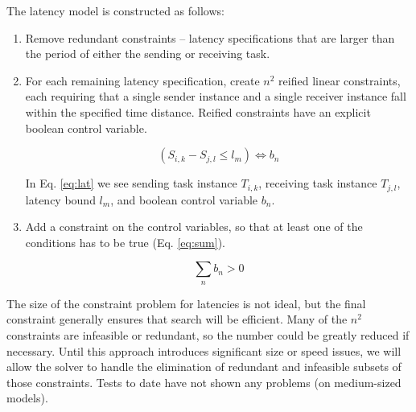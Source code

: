 The latency model is constructed as follows:

\begin{enumerate}
\item Remove redundant constraints -- latency specifications that are larger than the period of either the sending or receiving task.
\item For each remaining latency specification, create $n^2$ reified linear constraints, each requiring that a single sender instance and a single receiver instance fall within the specified time distance.  Reified constraints have an explicit boolean control variable.

\begin{equation}
\label{eq:lat}
(S_{i,k}  - S_{j,l}  \leqslant l_m ) \Leftrightarrow b_n 
\end{equation}

In Eq. \ref{eq:lat} we see sending task instance $T_{i,k}$, receiving task instance $T_{j,l}$, latency bound $l_m$, and boolean control variable $b_n$.

\item Add a constraint on the control variables, so that at least one of the conditions has to be true (Eq. \ref{eq:sum}).

\begin{equation}
\label{eq:sum}
\sum\limits_n {b_n  > 0} 
\end{equation}

\end{enumerate}

The size of the constraint problem for latencies is not ideal, but the final constraint generally ensures that search will be efficient.   Many of the $n^2$ constraints are infeasible or redundant, so the number could be greatly reduced if necessary.  Until this approach introduces significant size or speed issues, we will allow the solver to handle the elimination of redundant and infeasible subsets of those constraints.  Tests to date have not shown any problems (on medium-sized models).

